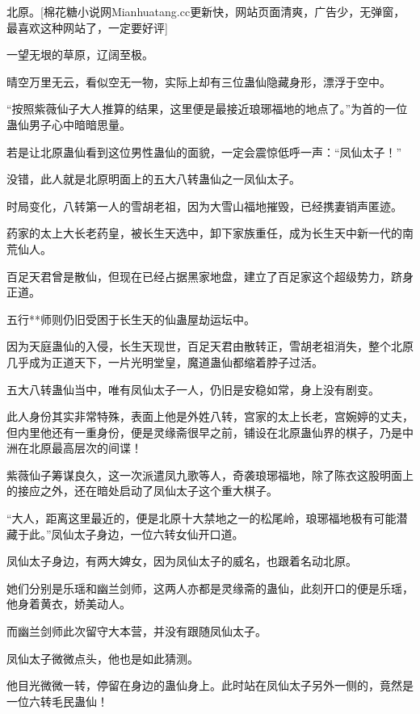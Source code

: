 
\begin{this_body}

北原。[棉花糖小说网Mianhuatang.cc更新快，网站页面清爽，广告少，无弹窗，最喜欢这种网站了，一定要好评]

一望无垠的草原，辽阔至极。

晴空万里无云，看似空无一物，实际上却有三位蛊仙隐藏身形，漂浮于空中。

“按照紫薇仙子大人推算的结果，这里便是最接近琅琊福地的地点了。”为首的一位蛊仙男子心中暗暗思量。

若是让北原蛊仙看到这位男性蛊仙的面貌，一定会震惊低呼一声：“凤仙太子！”

没错，此人就是北原明面上的五大八转蛊仙之一凤仙太子。

时局变化，八转第一人的雪胡老祖，因为大雪山福地摧毁，已经携妻销声匿迹。

药家的太上大长老药皇，被长生天选中，卸下家族重任，成为长生天中新一代的南荒仙人。

百足天君曾是散仙，但现在已经占据黑家地盘，建立了百足家这个超级势力，跻身正道。

五行**师则仍旧受困于长生天的仙蛊屋劫运坛中。

因为天庭蛊仙的入侵，长生天现世，百足天君由散转正，雪胡老祖消失，整个北原几乎成为正道天下，一片光明堂皇，魔道蛊仙都缩着脖子过活。

五大八转蛊仙当中，唯有凤仙太子一人，仍旧是安稳如常，身上没有剧变。

此人身份其实非常特殊，表面上他是外姓八转，宫家的太上长老，宫婉婷的丈夫，但内里他还有一重身份，便是灵缘斋很早之前，铺设在北原蛊仙界的棋子，乃是中洲在北原最高层次的间谍！

紫薇仙子筹谋良久，这一次派遣凤九歌等人，奇袭琅琊福地，除了陈衣这股明面上的接应之外，还在暗处启动了凤仙太子这个重大棋子。

“大人，距离这里最近的，便是北原十大禁地之一的松尾岭，琅琊福地极有可能潜藏于此。”凤仙太子身边，一位六转女仙开口道。

凤仙太子身边，有两大婢女，因为凤仙太子的威名，也跟着名动北原。

她们分别是乐瑶和幽兰剑师，这两人亦都是灵缘斋的蛊仙，此刻开口的便是乐瑶，他身着黄衣，娇美动人。

而幽兰剑师此次留守大本营，并没有跟随凤仙太子。

凤仙太子微微点头，他也是如此猜测。

他目光微微一转，停留在身边的蛊仙身上。此时站在凤仙太子另外一侧的，竟然是一位六转毛民蛊仙！


\end{this_body}
